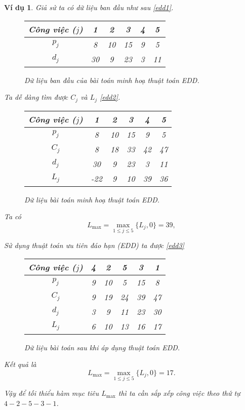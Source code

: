 \documentclass[12pt,a4paper]{report}
\newtheorem{vd}{Ví dụ}
\begin{document}
\begin{vd}
Giả sử ta có dữ liệu ban đầu như sau \eqref{edd1}.
\begin{figure}[h!]
\centering
	\begin{tabular}{|c | c c c c c |} 
	\hline
	Công việc ($j$) & 1 & 2 & 3 & 4 & 5 \\
	\hline\hline
	$p_j$ & 8 & 10 & 15 & 9 & 5 \\
	$d_j$ & 30 & 9 & 23 & 3 & 11 \\
	\hline
	\end{tabular}
	\caption{\label{edd1} Dữ liệu ban đầu của bài toán minh hoạ thuật toán EDD.}
\end{figure}

Ta dễ dàng tìm được $C_j$ và $L_j$ \eqref{edd2}.
\begin{figure}[h!]
\centering
	\begin{tabular}{|c | c c c c c |} 
	\hline
	Công việc ($j$) & 1 & 2 & 3 & 4 & 5 \\
	\hline\hline
	$p_j$ & 8 & 10 & 15 & 9 & 5 \\
	$C_j$ & 8 & 18 & 33 & 42 & 47 \\
	$d_j$ & 30 & 9 & 23 & 3 & 11 \\
	$L_j$ & -22 & 9 & 10 & 39 & 36 \\
	\hline
	\end{tabular}
	\caption{\label{edd2} Dữ liệu bài toán minh hoạ thuật toán EDD.}
\end{figure}

Ta có
\begin{equation*}
	L_{\max} = \max _{1 \leq j \leq 5} \{L_j, 0\} = 39,
\end{equation*}

Sử dụng thuật toán ưu tiên đáo hạn (EDD) ta được \eqref{edd3}

\begin{figure}[h!]
\centering
	\begin{tabular}{|c | c c c c c |} 
	\hline
	Công việc ($j$) & 4 & 2 & 5 & 3 & 1 \\
	\hline\hline
	$p_j$ & 9 & 10 & 5 & 15 & 8 \\
	$C_j$ & 9 & 19 & 24 & 39 & 47 \\
	$d_j$ & 3 & 9 & 11 & 23 & 30 \\
	$L_j$ & 6 & 10 & 13 & 16 & 17 \\
	\hline
	\end{tabular}
	\caption{\label{edd3} Dữ liệu bài toán sau khi áp dụng thuật toán EDD.}
\end{figure}

Kết quả là
\begin{equation*}
	L_{\max} = \max _{1 \leq j \leq 5} \{L_j, 0\} = 17.
\end{equation*}

Vậy để tối thiểu hàm mục tiêu $L_{\max}$ thì ta cần sắp xếp công việc theo thứ tự $4-2-5-3-1$.
\end{vd}
\end{document}
